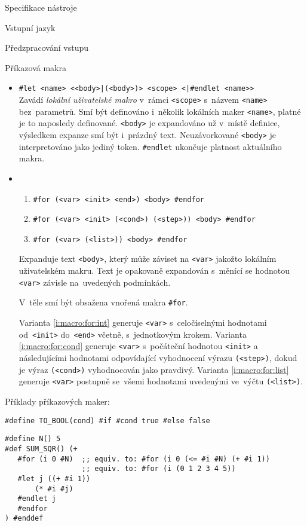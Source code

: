 \documentclass[thesis=M,czech]{FITthesis}[2012/06/26]
\newcommand{\id}[1]{\texttt{#1}}
\newcommand{\hl}[1]{\textit{#1}}
\newcommand{\rf}[1]{\ref{#1}}
\begin{document}
\begin{section}{Specifikace nástroje}
\begin{subsection}{Vstupní jazyk}
\begin{subsubsection}{Předzpracování vstupu}
\begin{paragraph}{Příkazová makra}
\begin{itemize}
   Ve~variantě \rf{i:macro:def:def} může být tělo i~víceřádkové;
   varianta \rf{i:macro:def:define} je zakončena koncem řádku.
\item \id{\#let <name> <{}<body>|(<body>)> <scope> <|\#endlet <name>{}>} \\
   Zavádí \hl{lokální uživatelské makro}
   v~rámci \id{<scope>} s~názvem \id{<name>}
   bez~parametrů. Smí být definováno i~několik lokálních maker \id{<name>},
   platné je to naposledy definované.
   \id{<body>} je expandováno už v~místě definice,
   výsledkem expanze smí být i~prázdný text.
   Neuzávorkované \id{<body>} je interpretováno jako jediný token.
   \id{\#endlet} ukončuje platnost aktuálního makra.
\item
   \begin{enumerate}
   \item \label{i:macro:for:int}
      \id{\#for (<var> <init> <end>) <body> \#endfor}
   \item \label{i:macro:for:cond}
      \id{\#for (<var> <init> (<cond>) (<step>)) <body> \#endfor}
   \item \label{i:macro:for:list}
      \id{\#for (<var> (<list>)) <body> \#endfor}
   \end{enumerate}
   Expanduje text \id{<body>}, který může záviset na \id{<var>}
   jakožto lokálním uživatelském makru.
   Text je opakovaně expandován s~měnící se hodnotou \id{<var>}
   závisle na~uvedených podmínkách.

   V~těle smí být obsažena vnořená makra \id{\#for}.

   Varianta \rf{i:macro:for:int} generuje \id{<var>}
   s~celočíselnými hodnotami od~\id{<init>} do~\id{<end>} včetně,
   s~jednotkovým krokem.
   Varianta \rf{i:macro:for:cond} generuje \id{<var>}
   s~počáteční hodnotou \id{<init>} a následujícími hodnotami
   odpovídající vyhodnocení výrazu \id{(<step>)},
   dokud je výraz \id{(<cond>)} vyhodnocován jako pravdivý.
   Varianta \rf{i:macro:for:list} generuje \id{<var>}
   postupně se~všemi hodnotami uvedenými ve~výčtu \id{(<list>)}.
\end{itemize}

Příklady příkazových maker:
\begin{Verbatim}
#define TO_BOOL(cond) #if #cond true #else false
\end{Verbatim}
\begin{Verbatim}[samepage=true]
#define N() 5
#def SUM_SQR() (+
   #for (i 0 #N)  ;; equiv. to: #for (i 0 (<= #i #N) (+ #i 1))
                  ;; equiv. to: #for (i (0 1 2 3 4 5))
   #let j ((+ #i 1))
       (* #i #j)
   #endlet j
   #endfor
) #enddef
\end{Verbatim}
\end{paragraph} %


\end{subsubsection}
\end{subsection}
\end{section}
\end{document}
